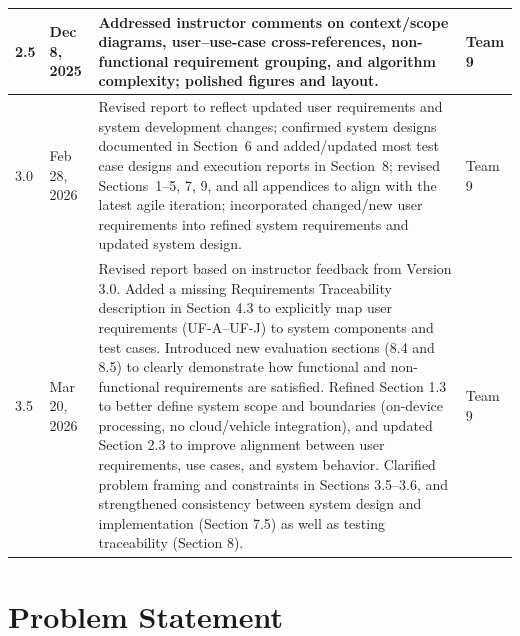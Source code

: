 \documentclass[11pt]{report}
\begin{document}
\begin{longtable}{|p{2cm}|p{3cm}|p{7.8cm}|p{3cm}|}
    2.5 & Dec 8, 2025 &
    Addressed instructor comments on context/scope diagrams, user--use-case cross-references, non-functional requirement grouping, and algorithm complexity; polished figures and layout. &
    Team 9 \\
    \hline

    3.0 & Feb 28, 2026 &
    Revised report to reflect updated user requirements and system development changes; confirmed system designs documented in Section~6 and added/updated most test case designs and execution reports in Section~8; revised Sections~1--5, 7, 9, and all appendices to align with the latest agile iteration; incorporated changed/new user requirements into refined system requirements and updated system design. &
    Team 9 \\
    \hline

    3.5 & Mar 20, 2026 &
    Revised report based on instructor feedback from Version 3.0. Added a missing Requirements Traceability description in Section 4.3 to explicitly map user requirements (UF-A–UF-J) to system components and test cases. Introduced new evaluation sections (8.4 and 8.5) to clearly demonstrate how functional and non-functional requirements are satisfied. Refined Section 1.3 to better define system scope and boundaries (on-device processing, no cloud/vehicle integration), and updated Section 2.3 to improve alignment between user requirements, use cases, and system behavior. Clarified problem framing and constraints in Sections 3.5–3.6, and strengthened consistency between system design and implementation (Section 7.5) as well as testing traceability (Section 8). &
    Team 9 \\
    \hline
\end{longtable}

\clearpage

\chapter{Problem Statement}
\end{document}
